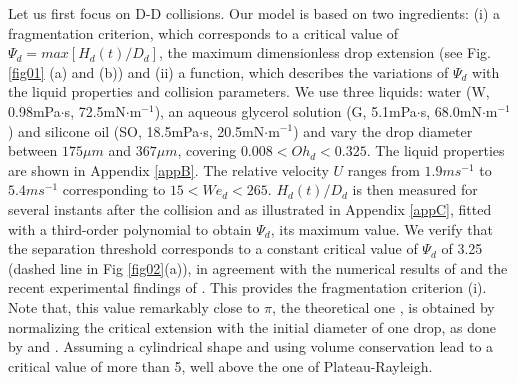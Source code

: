 \documentclass{article}
\begin{document}
Let us first focus on D-D collisions. Our model is based on two ingredients: {(i)} a fragmentation criterion, which corresponds to a critical value of $\Psi_d=max[H_d(t)/D_d]$, the maximum dimensionless drop extension (see Fig. \ref{fig01} (a) and (b)) and {(ii)} a function, which describes the variations of $\Psi_d$ with the liquid properties and collision parameters.
 We use three liquids:  water (W, 0.98mPa$\cdot$s, 72.5mN$\cdot$m$^{-1}$), an aqueous glycerol solution  (G, 5.1mPa$\cdot$s, 68.0mN$\cdot$m$^{-1}$) and silicone oil (SO, 18.5mPa$\cdot$s, 20.5mN$\cdot$m$^{-1}$) and vary the drop diameter between $175\mu m$ and $367\mu m$, covering $0.008 < Oh_d < 0.325$. The liquid properties are shown in Appendix \ref{appB}. The relative velocity $U$ ranges from $1.9 ms^{-1}$ to $5.4ms^{-1}$  corresponding to $15 < We_d < 265$.  $H_d(t)/D_d$  is then measured for several instants after the collision and as illustrated in Appendix \ref{appC}, fitted with a third-order polynomial to obtain $\Psi_d$, its maximum value. We verify that the separation threshold corresponds to a constant critical value of $\Psi_d$ of  {3.25} (dashed line in Fig \ref{fig02}(a)), in agreement with the numerical results of \cite{ref:Saroka2015} {and the recent experimental findings of \citet{al-dirawi_2021}}. {This provides the fragmentation criterion (i)}. {Note that, this value remarkably close to  $\pi$,  the theoretical one \citep{ref:Rayleigh1892}, is obtained by normalizing the critical extension with  the initial  diameter of one drop, as done by \citet{ref:Saroka2015} and \citet{ al-dirawi_2021}. Assuming a cylindrical shape and using volume conservation lead to a critical value of more than 5, well above the one of  Plateau-Rayleigh.}
 
\end{document}
